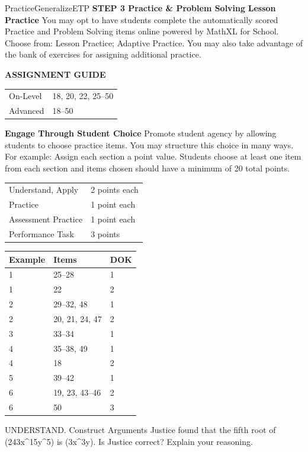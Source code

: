 \documentclass{article}
\newenvironment{item-analysis}{}{}      %
\newenvironment{practice}[2]{}{}        %
\newenvironment{te-addendum}[2]{}{}     %
\newcommand{\answer}[1]{}               %
\newcommand{\te}[1]{}                   %
\begin{document}
\begin{te-addendum}{Practice}{GeneralizeETP}
\textbf{STEP 3 Practice \& Problem Solving}
\textbf{Lesson Practice} You may opt to have students complete the automatically scored Practice and Problem Solving items online powered by MathXL for School.
Choose from: Lesson Practice; Adaptive Practice.
You may also take advantage of the bank of exercises for assigning additional practice.
\te{Practice \& Problem Solving and video tutorials are available at SavvasRealize.com. Scan the QR code to access a video tutorial.}
\textbf{ASSIGNMENT GUIDE}
\begin{tabular}{ll}
On-Level & 18, 20, 22, 25--50 \\
Advanced & 18--50 \\
\end{tabular}
\textbf{Engage Through Student Choice}
Promote student agency by allowing students to choose practice items. You may structure this choice in many ways.
For example:
Assign each section a point value. Students choose at least one item from each section and items chosen should have a minimum of 20 total points.
\begin{tabular}{ll}
Understand, Apply & 2 points each \\
Practice & 1 point each \\
Assessment Practice & 1 point each \\
Performance Task & 3 points \\
\end{tabular}
\end{te-addendum}
\begin{item-analysis}
\begin{tabular}{lll}
\toprule
Example & Items & DOK \\
\midrule
1 & 25--28 & 1 \\
1 & 22 & 2 \\
2 & 29--32, 48 & 1 \\
2 & 20, 21, 24, 47 & 2 \\
3 & 33--34 & 1 \\
4 & 35--38, 49 & 1 \\
4 & 18 & 2 \\
5 & 39--42 & 1 \\
6 & 19, 23, 43--46 & 2 \\
6 & 50 & 3 \\
\bottomrule
\end{tabular}
\end{item-analysis}
\begin{practice}{18}{2}
UNDERSTAND. Construct Arguments Justice found that the fifth root of (243x^{15}y^5) is (3x^3y). Is Justice correct? Explain your reasoning.
\answer{Yes, Justice is correct; ((3x^3y)^5=3^5(x^3)^5y^5=243x^{15}y^5).}
\end{practice}
\end{document}
